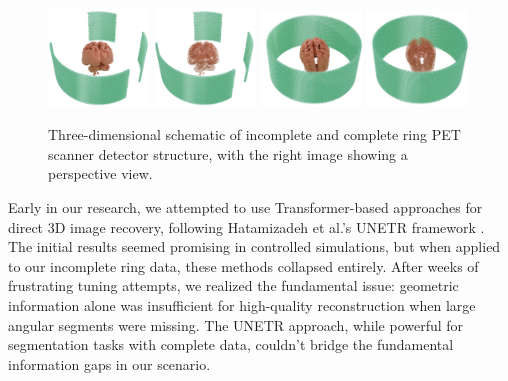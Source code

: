 \documentclass[
reprint,
superscriptaddress,
nofootinbib,
amsmath,amssymb,
aps,
prd,
]{revtex4-2}
\begin{document}
\begin{figure}[htbp]
    \centering
    \vspace{-0.2cm}
    \includegraphics[width=0.24\textwidth]{Images/Thehumanbrainismissing5}
    \includegraphics[width=0.24\textwidth]{Images/Thehumanbrainismissing4}
    \includegraphics[width=0.24\textwidth]{Images/Thehumanbrainisnotmissing3}
    \includegraphics[width=0.24\textwidth]{Images/Thehumanbrainisnotmissing4}
    \vspace{-0.2cm}
    \caption{Three-dimensional schematic of incomplete and complete ring PET scanner detector structure, with the right image showing a perspective view.}
    \vspace{-0.2cm}
    \label{fig:pet_structures2}
\end{figure}

Early in our research, we attempted to use Transformer-based approaches for direct 3D image recovery, following Hatamizadeh et al.'s UNETR framework \cite{hatamizadeh2021unetrtransformers3dmedical}. The initial results seemed promising in controlled simulations, but when applied to our incomplete ring data, these methods collapsed entirely. After weeks of frustrating tuning attempts, we realized the fundamental issue: geometric information alone was insufficient for high-quality reconstruction when large angular segments were missing. The UNETR approach, while powerful for segmentation tasks with complete data, couldn't bridge the fundamental information gaps in our scenario.
\end{document}
